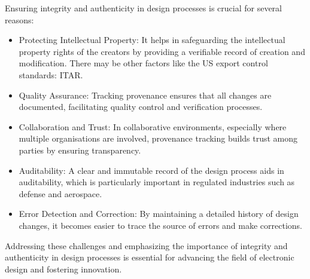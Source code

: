 \documentclass{tufte-handout}
\begin{document}
Ensuring integrity and authenticity in design processes is crucial for several reasons:
\begin{itemize}
    \item Protecting Intellectual Property: It helps in safeguarding the intellectual property rights of the creators by providing a verifiable record of
    creation and modification. There may be other factors like the US export control standards: ITAR.
    \item Quality Assurance: Tracking provenance ensures that all changes are documented, facilitating quality control and verification processes.
    \item Collaboration and Trust: In collaborative environments, especially where multiple organisations are involved, provenance tracking builds trust
    among parties by ensuring transparency.
    \item Auditability: A clear and immutable record of the design process aids in auditability, which is particularly important in regulated industries
    such as defense and aerospace.
    \item Error Detection and Correction: By maintaining a detailed history of design changes, it becomes easier to trace the source of errors and make corrections.
\end{itemize}

Addressing these challenges and emphasizing the importance of integrity and authenticity in design processes is essential for advancing the field of electronic
design and fostering innovation.
\end{document}
